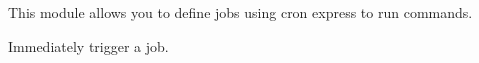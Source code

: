 
This module allows you to define jobs using cron express to run commands.

Immediately trigger a job.